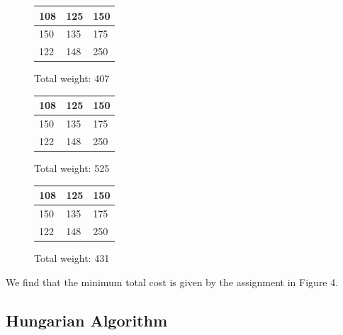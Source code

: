 \begin{figure}[H]
    \begin{minipage}[b]{0.3\textwidth}
      \centering
      \begin{tabular}{|m{0.5cm}|m{0.5cm}|m{0.5cm}|}
        \hline
        108 & 125 & \cellcolor{yellow!25} 150 \\
        \hline
        150 & \cellcolor{yellow!25} 135 & 175 \\
        \hline
        \cellcolor{yellow!25} 122 & 148 & 250 \\
        \hline
      \end{tabular}
      \caption{Total weight: 407}
      \label{tab:perm1}
    \end{minipage}
    \hfill
    \begin{minipage}[b]{0.3\textwidth}
      \centering
      \begin{tabular}{|m{0.5cm}|m{0.5cm}|m{0.5cm}|}
        \hline
        108 & \cellcolor{yellow!25} 125 & 150 \\
        \hline
        \cellcolor{yellow!25} 150 & 135 & 175 \\
        \hline
        122 & 148 & \cellcolor{yellow!25} 250 \\
        \hline
      \end{tabular}
      \caption{Total weight: 525}
      \label{tab:perm2}
    \end{minipage}
    \hfill
    \begin{minipage}[b]{0.3\textwidth}
      \centering
      \begin{tabular}{|m{0.5cm}|m{0.5cm}|m{0.5cm}|}
        \hline
        \cellcolor{yellow!25} 108 & 125 & 150 \\
        \hline
        150 & 135 & \cellcolor{yellow!25} 175 \\
        \hline
         122 & \cellcolor{yellow!25} 148 & 250 \\
        \hline
      \end{tabular}
      \caption{Total weight: 431}
      \label{tab:perm3}
    \end{minipage}
  \end{figure}
  
We find that the minimum total cost is given by the assignment in Figure 4.  

\subsection{Hungarian Algorithm}

